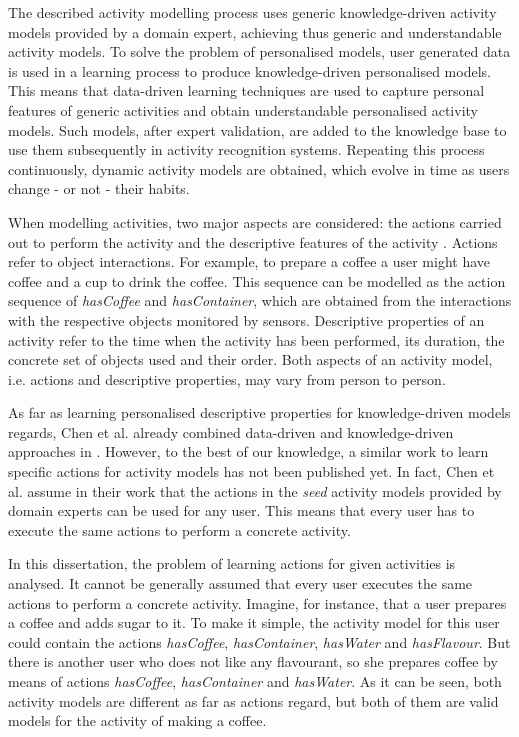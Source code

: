 The described activity modelling process uses generic knowledge-driven activity models provided by a domain expert, achieving thus generic and understandable activity models. To solve the problem of personalised models, user generated data is used in a learning process to produce knowledge-driven personalised models. This means that data-driven learning techniques are used to capture personal features of generic activities and obtain understandable personalised activity models. Such models, after expert validation, are added to the knowledge base to use them subsequently in activity recognition systems. Repeating this process continuously, dynamic activity models are obtained, which evolve in time as users change - or not - their habits.


When modelling activities, two major aspects are considered: the actions carried out to perform the activity and the descriptive features of the activity \cite{Chen2014}. Actions refer to object interactions. For example, to prepare a coffee a user might have coffee and a cup to drink the coffee. This sequence can be modelled as the action sequence of \textit{hasCoffee} and \textit{hasContainer}, which are obtained from the interactions with the respective objects monitored by sensors. Descriptive properties of an activity refer to the time when the activity has been performed, its duration, the concrete set of objects used and their order. Both aspects of an activity model, i.e. actions and descriptive properties, may vary from person to person. 

As far as learning personalised descriptive properties for knowledge-driven models regards, Chen et al. already combined data-driven and knowledge-driven approaches in \cite{Chen2014}. However, to the best of our knowledge, a similar work to learn specific actions for activity models has not been published yet. In fact, Chen et al. assume in their work that the actions in the \textit{seed} activity models provided by domain experts can be used for any user. This means that every user has to execute the same actions to perform a concrete activity.

In this dissertation, the problem of learning actions for given activities is analysed. It cannot be generally assumed that every user executes the same actions to perform a concrete activity. Imagine, for instance, that a user prepares a coffee and adds sugar to it. To make it simple, the activity model for this user could contain the actions \textit{hasCoffee}, \textit{hasContainer}, \textit{hasWater} and \textit{hasFlavour}. But there is another user who does not like any flavourant, so she prepares coffee by means of actions \textit{hasCoffee}, \textit{hasContainer} and  \textit{hasWater}. As it can be seen, both activity models are different as far as actions regard, but both of them are valid models for the activity of making a coffee. 

